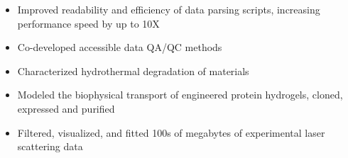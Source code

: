 \documentclass[10.9pt,letterpaper]{altacv}
\newlength{\comlogowidth}
\newcommand{\companylogo}[1]{%
	\savebox{\comlogobox}{\texttt{[image: \#1]}}%
	\settowidth{\comlogowidth}{\usebox{\comlogobox}}
}
\newcommand{\makelogospace}{\hspace*{\comlogowidth}\enspace}
\newcommand{\usecompanylogo}{\raisebox{0pt}[1em]{\usebox{\comlogobox}}\enspace}
\begin{document}
	
	\begin{fullwidth}
		\makecvheader
	\end{fullwidth}
	
	
\begin{itemize}
	\item Improved readability and efficiency of data parsing scripts, increasing performance speed by up to 10X
	\item Co-developed accessible data QA/QC methods
	\item Characterized hydrothermal degradation of materials
\end{itemize}
\divider	
	
	\begin{itemize}
		\item Modeled the biophysical transport of engineered protein hydrogels, cloned, expressed and purified
		\item Filtered, visualized, and fitted 100s of megabytes of experimental laser scattering data
	\end{itemize}	
	\divider
	
\end{document}
